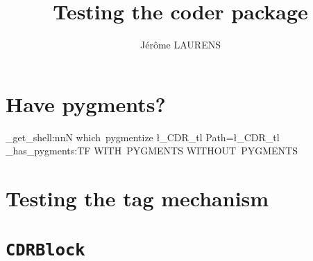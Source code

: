\documentclass[10pt,a4paper]{article}
\begin{document}
\title{Testing the \textsf{coder} package}
\author{Jérôme LAURENS}
\maketitle

\section{Have \textsf{pygments}?}
\ExplSyntaxOn
\sys_get_shell:nnN {which~pygmentize} {} \l_CDR_tl
Path=\l_CDR_tl\\
\CDR_has_pygments:TF { WITH~PYGMENTS } { WITHOUT~PYGMENTS }
\ExplSyntaxOff

\section{Testing the tag mechanism}
%

\section{}
%

\section{}
%

\section{}
%

\section{}


\section{\texttt{CDRBlock}}


\section{}
%
\end{document}
